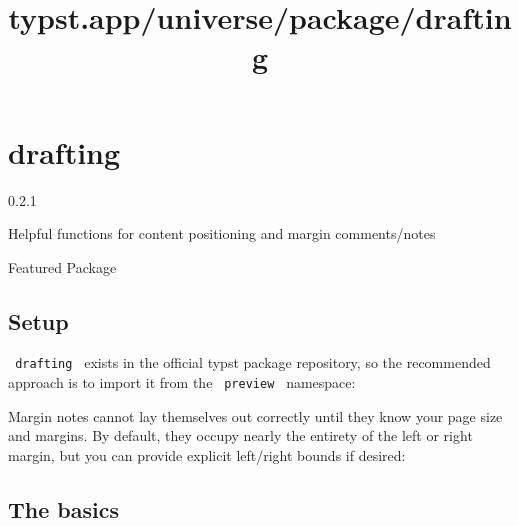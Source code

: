 \title{typst.app/universe/package/drafting}

\label{banner}
\section{drafting}\label{drafting}

{ 0.2.1 }

Helpful functions for content positioning and margin comments/notes

{ } Featured Package

\label{readme}
\subsection{Setup}\label{setup}

\texttt{\ drafting\ } exists in the official typst package repository,
so the recommended approach is to import it from the
\texttt{\ preview\ } namespace:

\begin{Shaded}
\begin{Highlighting}[]
\end{Highlighting}
\end{Shaded}

Margin notes cannot lay themselves out correctly until they know your
page size and margins. By default, they occupy nearly the entirety of
the left or right margin, but you can provide explicit left/right bounds
if desired:

\begin{Shaded}
\begin{Highlighting}[]
\end{Highlighting}
\end{Shaded}

\subsection{The basics}\label{the-basics}

